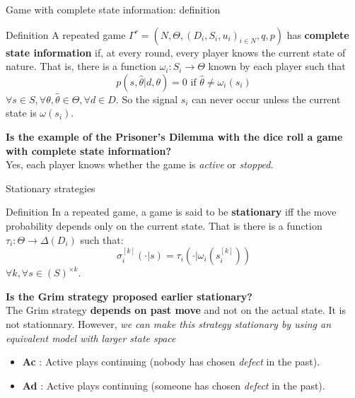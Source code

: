 \begin{frame}{Game with complete state information: definition}
    \begin{block}{Definition}
        A repeated game $\Gamma^r = (N,\Theta, (D_i,S_i,u_i)_{i\in N},q,p)$ has
        \textbf{complete state information} if, at every round, every player knows
        the current state of nature. That is, there is a function
        $\omega_i:S_i \rightarrow \Theta$ known by each player such that
        \begin{equation*}
            p(s,\hat{\theta} | d,\theta) = 0 \text{ if } \hat{\theta} \neq \omega_i(s_i)
        \end{equation*}
        $\forall s \in S, \forall \theta, \hat{\theta} \in \Theta, \forall d \in D$.
        So the signal $s_i$ can never occur unless the current state is $\omega(s_i)$.
    \end{block}

    \pause
    \textbf{{\color{green}Is the example of the Prisoner's Dilemma with the dice roll a game
    with complete state information?}} \\
    \pause
    Yes, each player knows whether the game is \textit{active} or \textit{stopped}.
\end{frame}

\begin{frame}{Stationary strategies}
    \begin{block}{Definition}
        In a repeated game, a game is said to be \textbf{stationary} iff the move probability
        depends only on the current state. That is there is a function $\tau_i : \Theta
        \rightarrow \Delta(D_i)$ such that:
        \begin{equation*}
	        \sigma_i^{[k]}(\cdot | s) = \tau_i(\cdot | \omega_i(s_i^{[k]}))
        \end{equation*}
        $\forall k, \forall s \in (S)^{\times k}$.
    \end{block}

    \pause
    \textbf{{\color{green}Is the Grim strategy proposed earlier stationary?}} \\
    \pause
    The Grim strategy \textbf{depends on past move} and not on the actual state. It
    is not stationnary.
    \pause
    However, \textit{we can make this strategy stationary by using an equivalent model with larger
    state space}
    \begin{itemize}
        \item \textbf{Ac} : Active plays continuing (nobody has chosen \textit{defect} in the past).
        \item \textbf{Ad} : Active plays continuing (someone has chosen \textit{defect} in the past).
    \end{itemize}
\end{frame}

